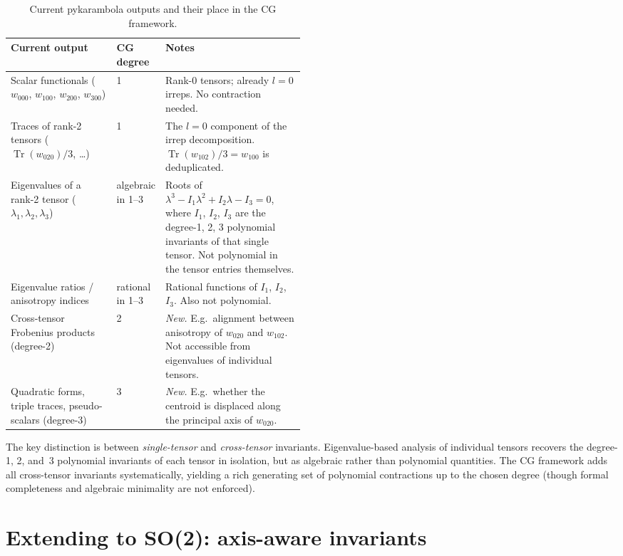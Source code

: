 \documentclass[11pt,a4paper]{article}
\begin{document}
\begin{table}[h]
\centering
\caption{Current pykarambola outputs and their place in the CG framework.}
\label{tab:existing}
\begin{tabularx}{\linewidth}{p{0.36\linewidth}p{0.12\linewidth}X}
\toprule
Current output & CG degree & Notes \\
\midrule
Scalar functionals ($w_{000}$, $w_{100}$, $w_{200}$, $w_{300}$)
  & 1 & Rank-0 tensors; already $l=0$ irreps. No contraction needed. \\
Traces of rank-2 tensors ($\operatorname{Tr}(w_{020})/3$, \ldots)
  & 1 & The $l=0$ component of the irrep decomposition.
        $\operatorname{Tr}(w_{102})/3 = w_{100}$ is deduplicated. \\
Eigenvalues of a rank-2 tensor ($\lambda_1, \lambda_2, \lambda_3$)
  & algebraic in 1--3 & Roots of $\lambda^3 - I_1\lambda^2 + I_2\lambda - I_3 = 0$,
        where $I_1$, $I_2$, $I_3$ are the degree-1, 2, 3 polynomial invariants
        of that single tensor.
        Not polynomial in the tensor entries themselves. \\
Eigenvalue ratios / anisotropy indices
  & rational in 1--3 & Rational functions of $I_1$, $I_2$, $I_3$.
        Also not polynomial. \\
\midrule
Cross-tensor Frobenius products (degree-2)
  & 2 & \emph{New.}
        E.g.\ alignment between anisotropy of $w_{020}$ and $w_{102}$.
        Not accessible from eigenvalues of individual tensors. \\
Quadratic forms, triple traces, pseudo-scalars (degree-3)
  & 3 & \emph{New.}
        E.g.\ whether the centroid is displaced along the principal axis of $w_{020}$. \\
\bottomrule
\end{tabularx}
\end{table}

\noindent
The key distinction is between \emph{single-tensor} and \emph{cross-tensor}
invariants.
Eigenvalue-based analysis of individual tensors recovers the degree-1, 2, and~3
polynomial invariants of each tensor in isolation, but as algebraic rather than
polynomial quantities.
The CG framework adds all cross-tensor invariants systematically,
yielding a rich generating set of polynomial contractions up to the chosen
degree (though formal completeness and algebraic minimality are not enforced).

\section{Extending to SO(2): axis-aware invariants}
\label{sec:so2}
\end{document}
